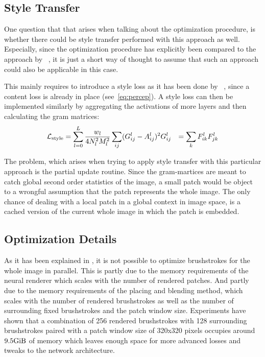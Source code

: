 \subsection{Style Transfer}

One question that that arises when talking about the optimization procedure, is whether there could be style transfer performed with this approach as well.
Especially, since the optimization procedure has explicitly been compared to the approach by \citeauthor*{Gatys}~\cite{Gatys}, it is just a short way of thought to assume that such an approach could also be applicable in this case.

This mainly requires to introduce a style loss as it has been done by \citeauthor*{Gatys}~\cite{Gatys}, since a content loss is already in place (see~\eqref{eq:percep}).
A style loss can then be implemented similarly by aggregating the activations of more layers and then calculating the gram matrices:
\begin{align}
    \mathcal{L}_{\text{style}} & = \sum_{l=0}^L \frac{w_l}{4 N^2_l M^2_l} \sum_{ij} (G_{ij}^l - A_{ij}^l)^2
    G_{ij}^l & = \sum_k F_{ik}^l F_{jk}^l
\end{align}

The problem, which arises when trying to apply style transfer with this particular approach is the partial update routine.
Since the gram-martices are meant to catch global second order statistics of the image, a small patch would be object to a wrongful assumption that the patch represents the whole image.
The only chance of dealing with a local patch in a global context in image space, is a cached version of the current whole image in which the patch is embedded.

\subsection{Optimization Details}

As it has been explained in , it is not possible to optimize brushstrokes for the whole image in parallel.
This is partly due to the memory requirements of the neural renderer which scales with the number of rendered patches.
And partly due to the memory requirements of the placing and blending method, which scales with the number of rendered brushstrokes as well as the number of surrounding fixed brushstrokes and the patch window size.
Experiments have shown that a combination of 256 rendered brushstrokes with 128 surrounding brushstrokes paired with a patch window size of 320x320 pixels occupies around $9.5 \si{\gibi \byte}$ of memory which leaves enough space for more advanced losses and tweaks to the network architecture.

